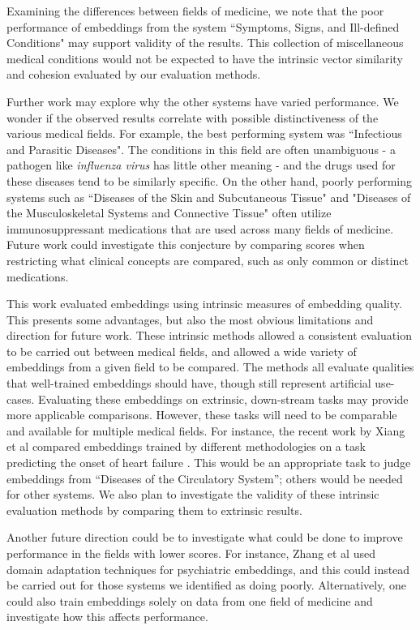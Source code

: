 \documentclass[11pt,a4paper]{article}
\begin{document}
Examining the differences between fields of medicine, we note that the poor performance of embeddings from the system ``Symptoms, Signs, and Ill-defined Conditions" may support validity of the results. This collection of miscellaneous medical conditions would not be expected to have the intrinsic vector similarity and cohesion evaluated by our evaluation methods.   

Further work may explore why the other systems have varied performance. We wonder if the observed results correlate with possible distinctiveness of the various medical fields. For example, the best performing system was ``Infectious and Parasitic Diseases". The conditions in this field are often unambiguous - a pathogen like \emph{influenza virus} has little other meaning - and the drugs used for these diseases tend to be similarly specific. On the other hand,  poorly performing systems such as ``Diseases of the Skin and Subcutaneous Tissue" and "Diseases of the Musculoskeletal Systems and Connective Tissue" often utilize immunosuppressant medications that are used across many fields of medicine. Future work could investigate this conjecture by comparing scores when restricting what clinical concepts are compared, such as only common or distinct medications. 

This work evaluated embeddings using intrinsic measures of embedding quality. This presents some advantages, but also the most obvious limitations and direction for future work. These intrinsic methods allowed a consistent evaluation to be carried out between medical fields, and allowed a wide variety of embeddings from a given field to be compared. The methods all evaluate qualities that well-trained embeddings should have, though still represent artificial use-cases. Evaluating these embeddings on extrinsic, down-stream tasks may provide more applicable comparisons. However, these tasks will need to be comparable and available for multiple medical fields. For instance, the recent work by Xiang et al  compared embeddings trained by different methodologies on a task predicting the onset of heart failure \cite{rasmyStudyGeneralizabilityRecurrent2018}. This would be an appropriate task to judge embeddings from ``Diseases of the Circulatory System'';  others would be needed for other systems. We  also plan to investigate the validity of these intrinsic evaluation methods by comparing them to extrinsic results. 

Another future direction could be to investigate what could be done to improve performance in the fields with lower scores. For instance, Zhang et al  used domain adaptation techniques for psychiatric embeddings, and this could instead be carried out for those systems we identified as doing poorly. Alternatively, one could also train embeddings solely on data from one field of medicine and investigate how this affects performance. 




\end{document}
